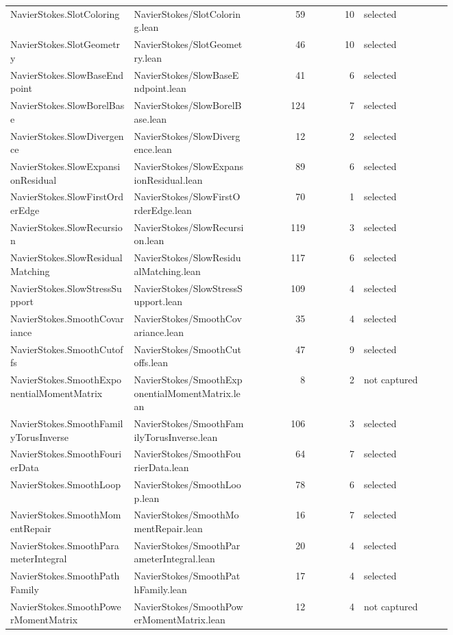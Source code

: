\documentclass[10pt]{article}
\begin{document}
\begin{longtable}{p{0.28\linewidth}p{0.27\linewidth}r r p{0.20\linewidth}}
NavierStokes.SlotColoring & NavierStokes/SlotColoring.lean & 59 & 10 & selected\\
NavierStokes.SlotGeometry & NavierStokes/SlotGeometry.lean & 46 & 10 & selected\\
NavierStokes.SlowBaseEndpoint & NavierStokes/SlowBaseEndpoint.lean & 41 & 6 & selected\\
NavierStokes.SlowBorelBase & NavierStokes/SlowBorelBase.lean & 124 & 7 & selected\\
NavierStokes.SlowDivergence & NavierStokes/SlowDivergence.lean & 12 & 2 & selected\\
NavierStokes.SlowExpansionResidual & NavierStokes/SlowExpansionResidual.lean & 89 & 6 & selected\\
NavierStokes.SlowFirstOrderEdge & NavierStokes/SlowFirstOrderEdge.lean & 70 & 1 & selected\\
NavierStokes.SlowRecursion & NavierStokes/SlowRecursion.lean & 119 & 3 & selected\\
NavierStokes.SlowResidualMatching & NavierStokes/SlowResidualMatching.lean & 117 & 6 & selected\\
NavierStokes.SlowStressSupport & NavierStokes/SlowStressSupport.lean & 109 & 4 & selected\\
NavierStokes.SmoothCovariance & NavierStokes/SmoothCovariance.lean & 35 & 4 & selected\\
NavierStokes.SmoothCutoffs & NavierStokes/SmoothCutoffs.lean & 47 & 9 & selected\\
NavierStokes.SmoothExponentialMomentMatrix & NavierStokes/SmoothExponentialMomentMatrix.lean & 8 & 2 & not captured\\
NavierStokes.SmoothFamilyTorusInverse & NavierStokes/SmoothFamilyTorusInverse.lean & 106 & 3 & selected\\
NavierStokes.SmoothFourierData & NavierStokes/SmoothFourierData.lean & 64 & 7 & selected\\
NavierStokes.SmoothLoop & NavierStokes/SmoothLoop.lean & 78 & 6 & selected\\
NavierStokes.SmoothMomentRepair & NavierStokes/SmoothMomentRepair.lean & 16 & 7 & selected\\
NavierStokes.SmoothParameterIntegral & NavierStokes/SmoothParameterIntegral.lean & 20 & 4 & selected\\
NavierStokes.SmoothPathFamily & NavierStokes/SmoothPathFamily.lean & 17 & 4 & selected\\
NavierStokes.SmoothPowerMomentMatrix & NavierStokes/SmoothPowerMomentMatrix.lean & 12 & 4 & not captured\\

\end{longtable}
\end{document}
